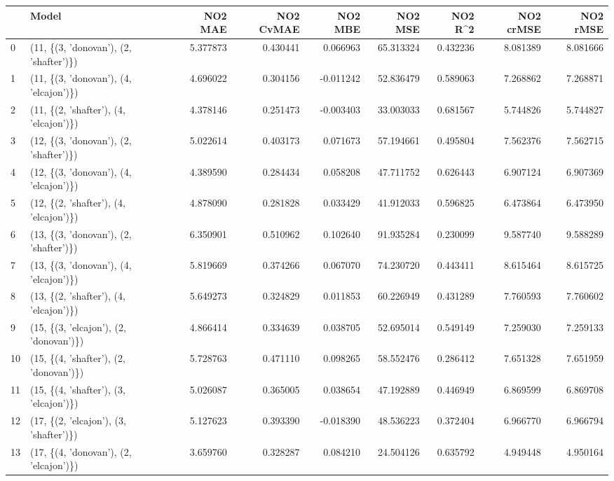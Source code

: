\begin{tabular}{llrrrrrrr}
\toprule
{} &                                   Model &   NO2 MAE &  NO2 CvMAE &   NO2 MBE &    NO2 MSE &   NO2 R\textasciicircum2 &  NO2 crMSE &  NO2 rMSE \\
\midrule
0  &  (11, \{(3, 'donovan'), (2, 'shafter')\}) &  5.377873 &   0.430441 &  0.066963 &  65.313324 &  0.432236 &   8.081389 &  8.081666 \\
1  &  (11, \{(3, 'donovan'), (4, 'elcajon')\}) &  4.696022 &   0.304156 & -0.011242 &  52.836479 &  0.589063 &   7.268862 &  7.268871 \\
2  &  (11, \{(2, 'shafter'), (4, 'elcajon')\}) &  4.378146 &   0.251473 & -0.003403 &  33.003033 &  0.681567 &   5.744826 &  5.744827 \\
3  &  (12, \{(3, 'donovan'), (2, 'shafter')\}) &  5.022614 &   0.403173 &  0.071673 &  57.194661 &  0.495804 &   7.562376 &  7.562715 \\
4  &  (12, \{(3, 'donovan'), (4, 'elcajon')\}) &  4.389590 &   0.284434 &  0.058208 &  47.711752 &  0.626443 &   6.907124 &  6.907369 \\
5  &  (12, \{(2, 'shafter'), (4, 'elcajon')\}) &  4.878090 &   0.281828 &  0.033429 &  41.912033 &  0.596825 &   6.473864 &  6.473950 \\
6  &  (13, \{(3, 'donovan'), (2, 'shafter')\}) &  6.350901 &   0.510962 &  0.102640 &  91.935284 &  0.230099 &   9.587740 &  9.588289 \\
7  &  (13, \{(3, 'donovan'), (4, 'elcajon')\}) &  5.819669 &   0.374266 &  0.067070 &  74.230720 &  0.443411 &   8.615464 &  8.615725 \\
8  &  (13, \{(2, 'shafter'), (4, 'elcajon')\}) &  5.649273 &   0.324829 &  0.011853 &  60.226949 &  0.431289 &   7.760593 &  7.760602 \\
9  &  (15, \{(3, 'elcajon'), (2, 'donovan')\}) &  4.866414 &   0.334639 &  0.038705 &  52.695014 &  0.549149 &   7.259030 &  7.259133 \\
10 &  (15, \{(4, 'shafter'), (2, 'donovan')\}) &  5.728763 &   0.471110 &  0.098265 &  58.552476 &  0.286412 &   7.651328 &  7.651959 \\
11 &  (15, \{(4, 'shafter'), (3, 'elcajon')\}) &  5.026087 &   0.365005 &  0.038654 &  47.192889 &  0.446949 &   6.869599 &  6.869708 \\
12 &  (17, \{(2, 'elcajon'), (3, 'shafter')\}) &  5.127623 &   0.393390 & -0.018390 &  48.536223 &  0.372404 &   6.966770 &  6.966794 \\
13 &  (17, \{(4, 'donovan'), (2, 'elcajon')\}) &  3.659760 &   0.328287 &  0.084210 &  24.504126 &  0.635792 &   4.949448 &  4.950164 \\

\end{tabular}
